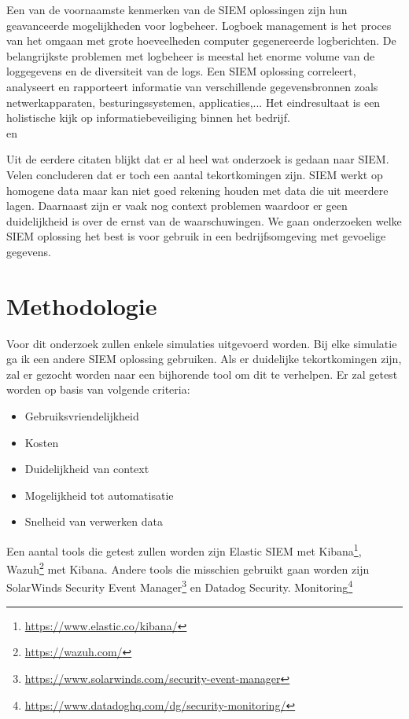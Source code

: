 Een van de voornaamste kenmerken van de SIEM oplossingen zijn hun geavanceerde mogelijkheden voor logbeheer. Logboek management is het proces van het omgaan met grote hoeveelheden computer gegenereerde logberichten. De belangrijkste problemen met logbeheer is meestal het enorme volume van de loggegevens en de diversiteit van de logs. Een SIEM oplossing correleert, analyseert en rapporteert informatie van verschillende gegevensbronnen zoals netwerkapparaten, besturingssystemen, applicaties,... Het eindresultaat is een holistische kijk op informatiebeveiliging binnen het bedrijf.\\\autocite{Cerullo2014} en \autocite{Mavroeidis2021}\medskip

Uit de eerdere citaten blijkt dat er al heel wat onderzoek is gedaan naar SIEM. Velen concluderen dat er toch een aantal tekortkomingen zijn. SIEM werkt op homogene data maar kan niet goed rekening houden met data die uit meerdere lagen. Daarnaast zijn er vaak nog context problemen waardoor er geen duidelijkheid is over de ernst van de waarschuwingen. We gaan onderzoeken welke SIEM oplossing het best is voor gebruik in een bedrijfsomgeving met gevoelige gegevens.



\section{Methodologie}
\label{sec:methodologie}

Voor dit onderzoek zullen enkele simulaties uitgevoerd worden. Bij elke simulatie ga ik een andere SIEM oplossing gebruiken. Als er duidelijke tekortkomingen zijn, zal er gezocht worden naar een bijhorende tool om dit te verhelpen. Er zal getest worden op basis van volgende criteria:
\medskip
\begin{itemize}
\item Gebruiksvriendelijkheid
\item Kosten
\item Duidelijkheid van context
\item Mogelijkheid tot automatisatie
\item Snelheid van verwerken data
\end{itemize}
\medskip
Een aantal tools die getest zullen worden zijn Elastic SIEM met Kibana\footnote{\url{https://www.elastic.co/kibana/}}, Wazuh\footnote{\url{https://wazuh.com/}} met Kibana.
Andere tools die misschien gebruikt gaan worden zijn SolarWinds Security Event Manager\footnote{\url{https://www.solarwinds.com/security-event-manager}} en Datadog Security. Monitoring\footnote{\url{https://www.datadoghq.com/dg/security-monitoring/}}\medskip


